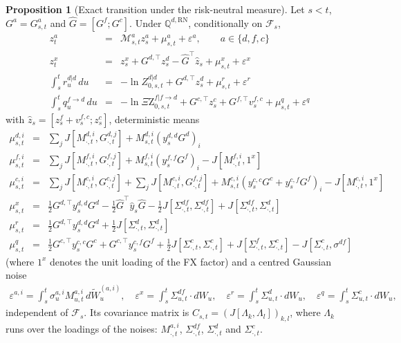 \documentclass[11pt,english]{amsart}
\newcommand{\RN}{\mathrm{RN}}
\newcommand{\QQ}{\mathbb{Q}}
\newcommand{\QZ}{{\Xi\mathrm{Z}}}
\theoremstyle{definition}
\newtheorem{prop}{Proposition}
\begin{document}
\begin{prop}[Exact transition under the risk-neutral measure]\label{prop:lgcm_transition_rn}
Let $s<t$, $G^a = G^a_{s,t}$ and $\hat{G} = [G^f;G^c]$. Under $\QQ^{d,\RN}$, conditionally on $\mathcal{F}_s$,
\begin{eqnarray*}
  z^a_t &=& \mathcal{M}^a_{s,t}z^a_s + \mu^a_{s,t} + \varepsilon^a , \qquad a\in\{d,f,c\} \\
  z^x_t &=& z^x_s + G^{d,\top}z^d_s - \hat{G}^\top\hat{z}_s + \mu^x_{s,t} + \varepsilon^x \\
  \int_s^t r^{d|d}_u\,du &=& -\ln Z^{d|d}_{0,s,t} + G^{d,\top}z^d_s + \mu^r_{s,t} + \varepsilon^r \\
  \int_s^t q^{f\to d}_u\,du &=& -\ln \QZ^{f|f\to d}_{0,s,t} + G^{c,\top}z^c_s + G^{f,\top} v^{f,c}_s + \mu^q_{s,t} + \varepsilon^q
\end{eqnarray*}
with $\hat{z}_s = [z^f_s + v^{f,c}_s ; z^c_s]$, deterministic means
\begin{eqnarray*}
  \mu^{d,i}_{s,t} &=& \textstyle\sum_{j} J[M^{d,i}_{\cdot,t},G^{d,j}_{\cdot,t}] + M^{d,i}_{s,t}\left(y^{d,d}_sG^d\right)_i \\
  \mu^{f,i}_{s,t} &=& \textstyle\sum_{j} J[M^{f,i}_{\cdot,t},G^{f,j}_{\cdot,t}] + M^{f,i}_{s,t}\left(y^{f,f}_sG^f\right)_i - J[M^{f,i}_{\cdot,t},1^x] \\
  \mu^{c,i}_{s,t} &=& \textstyle\sum_{j} J[M^{c,i}_{\cdot,t},G^{c,j}_{\cdot,t}] + \sum_{j} J[M^{c,i}_{\cdot,t},G^{f,j}_{\cdot,t}] + M^{c,i}_{s,t}\left(y^{c,c}_sG^c + y^{c,f}_sG^f\right)_i - J[M^{c,i}_{\cdot,t},1^x] \\
  \mu^x_{s,t} &=& \frac{1}{2}G^{d,\top}y^{d,d}_sG^d - \frac{1}{2}\hat{G}^\top\hat{y}_s\hat{G} - \frac{1}{2}J[\Sigma^{df}_{\cdot,t},\Sigma^{df}_{\cdot,t}] + J[\Sigma^{df}_{\cdot,t},\Sigma^{d}_{\cdot,t}] \\
  \mu^r_{s,t} &=& \frac{1}{2}G^{d,\top}y^{d,d}_sG^d + \frac{1}{2}J[\Sigma^{d}_{\cdot,t},\Sigma^{d}_{\cdot,t}] \\
  \mu^q_{s,t} &=& \frac{1}{2}G^{c,\top}y^{c,c}_sG^c + G^{c,\top}y^{c,f}_sG^f + \frac{1}{2}J[\Sigma^{c}_{\cdot,t},\Sigma^{c}_{\cdot,t}] + J[\Sigma^{f}_{\cdot,t},\Sigma^{c}_{\cdot,t}] - J[\Sigma^{c}_{\cdot,t},\sigma^{df}]
\end{eqnarray*}
(where $1^x$ denotes the unit loading of the FX factor) and a centred Gaussian noise
\begin{eqnarray*}
  \varepsilon^{a,i} = \int_s^t \sigma^{a,i}_u M^{a,i}_{u,t} \, d\widetilde{W}^{(a,i)}_u , \quad
  \varepsilon^x = \int_s^t \Sigma^{df}_{u,t}\cdot dW_u , \quad
  \varepsilon^r = \int_s^t \Sigma^{d}_{u,t}\cdot dW_u , \quad
  \varepsilon^q = \int_s^t \Sigma^{c}_{u,t}\cdot dW_u ,
\end{eqnarray*}
independent of $\mathcal{F}_s$. Its covariance matrix is $C_{s,t} = \left(J[\Lambda_k,\Lambda_l]\right)_{k,l}$, where $\Lambda_k$ runs over the loadings of the noises: $M^{a,i}_{\cdot,t}$, $\Sigma^{df}_{\cdot,t}$, $\Sigma^d_{\cdot,t}$ and $\Sigma^c_{\cdot,t}$.
\end{prop}
\end{document}

